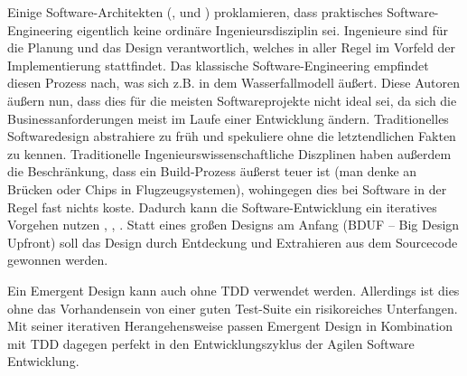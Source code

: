 








Einige Software-Architekten (\citeauthor*{neal_ford_emergent_2010}, \citeauthor*{jack_reeves_three_1992} und \citeauthor{glenn_vanderburg_real_2010}) proklamieren, dass praktisches Software-Engineering eigentlich keine ordinäre Ingenieursdisziplin sei. Ingenieure sind für die Planung und das Design verantwortlich, welches in aller Regel im Vorfeld der Implementierung stattfindet. Das klassische Software-Engineering empfindet diesen Prozess nach, was sich z.B. in dem Wasserfallmodell äußert. Diese Autoren äußern nun, dass dies für die meisten Softwareprojekte nicht ideal sei, da sich die Businessanforderungen meist im Laufe einer Entwicklung ändern. Traditionelles Softwaredesign abstrahiere zu früh und spekuliere ohne die letztendlichen Fakten zu kennen. Traditionelle Ingenieurswissenschaftliche Diszplinen haben außerdem die Beschränkung, dass ein Build-Prozess äußerst teuer ist (man denke an Brücken oder Chips in Flugzeugsystemen), wohingegen dies bei Software in der Regel fast nichts koste. Dadurch kann die Software-Entwicklung ein iteratives Vorgehen nutzen \citep{neal_ford_emergent_2010}, \citep{glenn_vanderburg_real_2010}, \citep{jack_reeves_three_1992}. Statt eines großen Designs am Anfang (BDUF -- Big Design Upfront) soll das Design durch Entdeckung und Extrahieren aus dem Sourcecode gewonnen werden.


Ein Emergent Design kann auch ohne TDD verwendet werden. Allerdings ist dies ohne das Vorhandensein von einer guten Test-Suite ein risikoreiches Unterfangen.
Mit seiner iterativen Herangehensweise passen Emergent Design in Kombination mit TDD dagegen perfekt in den Entwicklungszyklus der Agilen Software Entwicklung.


